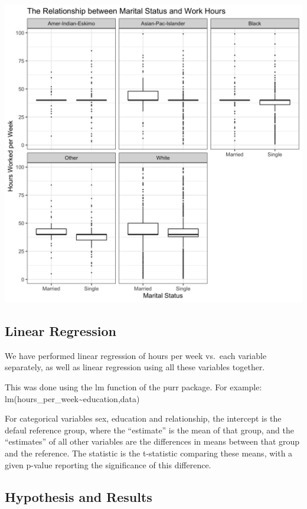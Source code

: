 \documentclass[]{article}
\begin{document}
\includegraphics{../images/Plot_4_Marital_Status_and_Work_Hours.png}

\hypertarget{linear-regression}{%
\subsection{Linear Regression}\label{linear-regression}}

We have performed linear regression of hours per week vs.~each variable
separately, as well as linear regression using all these variables
together.

This was done using the lm function of the purr package. For example:
lm(hours\_per\_week\textasciitilde education,data)

For categorical variables sex, education and relationship, the intercept
is the defaul reference group, where the ``estimate'' is the mean of
that group, and the ``estimates'' of all other variables are the
differences in means between that group and the reference. The statistic
is the t-statistic comparing these means, with a given p-value reporting
the significance of this difference.

\hypertarget{hypothesis-and-results}{%
\subsection{Hypothesis and Results}\label{hypothesis-and-results}}
\end{document}
